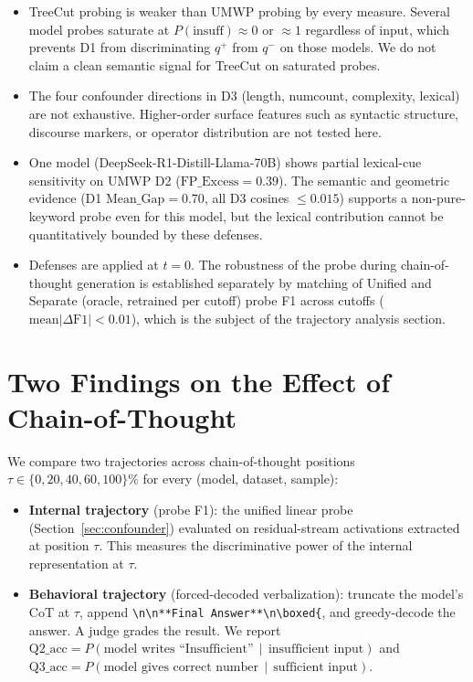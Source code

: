 \begin{itemize}
\item TreeCut probing is weaker than UMWP probing by every measure.
Several model probes saturate at $P(\text{insuff})\!\approx\!0$ or
$\approx\!1$ regardless of input, which prevents D1 from
discriminating $q^+$ from $q^-$ on those models. We do not claim a
clean semantic signal for TreeCut on saturated probes.

\item The four confounder directions in D3 (length, numcount,
complexity, lexical) are not exhaustive. Higher-order surface
features such as syntactic structure, discourse markers, or
operator distribution are not tested here.

\item One model (DeepSeek-R1-Distill-Llama-70B) shows partial
lexical-cue sensitivity on UMWP D2
($\mathrm{FP\_Excess} = 0.39$). The semantic and geometric evidence
(D1 $\mathrm{Mean\_Gap} = 0.70$, all D3 cosines $\le 0.015$) supports
a non-pure-keyword probe even for this model, but the lexical
contribution cannot be quantitatively bounded by these defenses.

\item Defenses are applied at $t{=}0$. The robustness of the probe
during chain-of-thought generation is established separately by
matching of Unified and Separate (oracle, retrained per cutoff)
probe F1 across cutoffs ($\mathrm{mean}|\Delta\mathrm{F1}|<0.01$),
which is the subject of the trajectory analysis section.
\end{itemize}


\section{Two Findings on the Effect of Chain-of-Thought}
\label{sec:cot-findings}

We compare two trajectories across chain-of-thought positions
$\tau \in \{0, 20, 40, 60, 100\}$\% for every (model, dataset, sample):

\begin{itemize}
\item \textbf{Internal trajectory} (probe F1): the unified linear probe
(Section~\ref{sec:confounder}) evaluated on residual-stream activations
extracted at position $\tau$. This measures the discriminative power of
the internal representation at $\tau$.

\item \textbf{Behavioral trajectory} (forced-decoded verbalization):
truncate the model's CoT at $\tau$, append
\verb|\n\n**Final Answer**\n\boxed{|, and greedy-decode the answer.
A judge grades the result. We report
$\mathrm{Q2\_acc} = P(\text{model writes ``Insufficient''}\,\mid\,\text{insufficient input})$
and
$\mathrm{Q3\_acc} = P(\text{model gives correct number}\,\mid\,\text{sufficient input})$.
\end{itemize}

